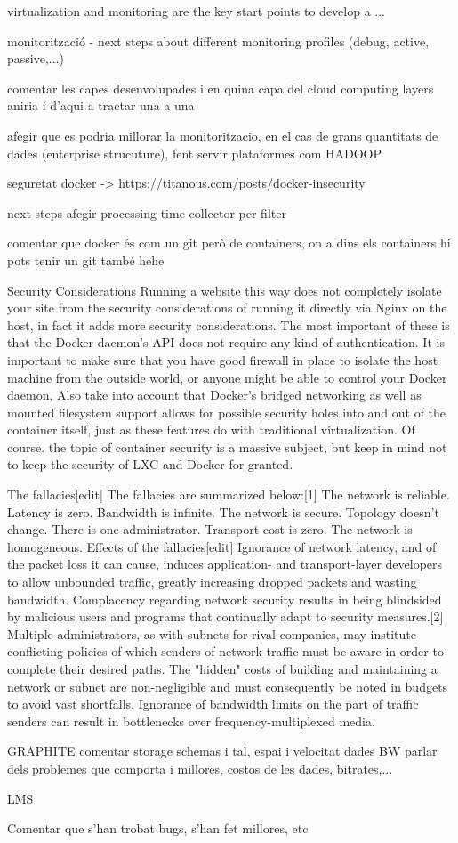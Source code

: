 virtualization and monitoring are the key start points to develop a ...

monitorització - next steps about different monitoring profiles (debug, active, passive,...)

comentar les capes desenvolupades i en quina capa del cloud computing layers aniria i d'aqui a tractar una a una

afegir que es podria millorar la monitoritzacio, en el cas de grans quantitats de dades (enterprise strucuture), fent servir plataformes com HADOOP

seguretat docker -> https://titanous.com/posts/docker-insecurity

next steps afegir processing time collector per filter


comentar que docker és com un git però de containers, on a dins els containers hi pots tenir un git també hehe

Security Considerations
Running a website this way does not completely isolate your site from the security considerations of running it directly via Nginx on the host, in fact it adds more security considerations. The most important of these is that the Docker daemon’s API does not require any kind of authentication. It is important to make sure that you have good firewall in place to isolate the host machine from the outside world, or anyone might be able to control your Docker daemon. Also take into account that Docker’s bridged networking as well as mounted filesystem support allows for possible security holes into and out of the container itself, just as these features do with traditional virtualization. Of course. the topic of container security is a massive subject, but keep in mind not to keep the security of LXC and Docker for granted.

The fallacies[edit]
The fallacies are summarized below:[1]
The network is reliable.
Latency is zero.
Bandwidth is infinite.
The network is secure.
Topology doesn't change.
There is one administrator.
Transport cost is zero.
The network is homogeneous.
Effects of the fallacies[edit]
Ignorance of network latency, and of the packet loss it can cause, induces application- and transport-layer developers to allow unbounded traffic, greatly increasing dropped packets and wasting bandwidth.
Complacency regarding network security results in being blindsided by malicious users and programs that continually adapt to security measures.[2]
Multiple administrators, as with subnets for rival companies, may institute conflicting policies of which senders of network traffic must be aware in order to complete their desired paths.
The "hidden" costs of building and maintaining a network or subnet are non-negligible and must consequently be noted in budgets to avoid vast shortfalls.
Ignorance of bandwidth limits on the part of traffic senders can result in bottlenecks over frequency-multiplexed media.


GRAPHITE
comentar storage schemas i tal, espai i velocitat dades BW
parlar dels problemes que comporta i millores, costos de les dades, bitrates,...


LMS

Comentar que s'han trobat bugs, s'han fet millores, etc